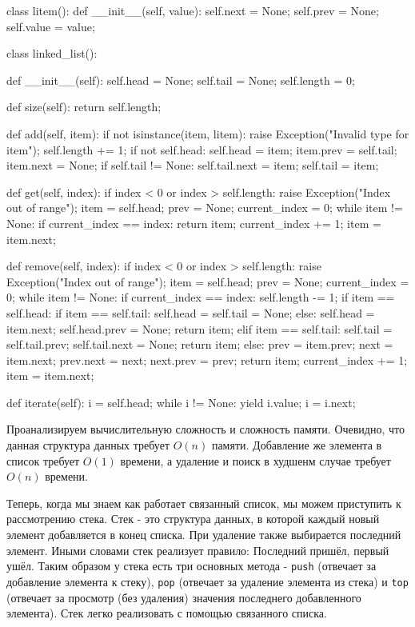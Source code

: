 \begin{python}
class litem():
	def __init__(self, value):
		self.next = None;
		self.prev = None;
		self.value = value;

class linked_list():

	def __init__(self):
		self.head = None;
		self.tail = None;
		self.length = 0;

	def size(self):
		return self.length;

	def add(self, item):
		if not isinstance(item, litem):
			raise Exception("Invalid type for item");
		self.length += 1;
		if not self.head:
			self.head = item;
		item.prev = self.tail;
		item.next = None;
		if self.tail != None:
			self.tail.next = item;
		self.tail = item;

	def get(self, index):
		if index < 0 or index > self.length:
			raise Exception("Index out of range");
		item = self.head;
		prev = None;
		current_index = 0;
		while item != None:
			if current_index == index:
				return item;
			current_index += 1;
			item = item.next;

	def remove(self, index):
		if index < 0 or index > self.length:
			raise Exception("Index out of range");
		item = self.head;
		prev = None;
		current_index = 0;
		while item != None:
			if current_index == index:
				self.length -= 1;
				if item == self.head:
					if item == self.tail:
						self.head = self.tail = None;
					else:
						self.head = item.next;
						self.head.prev = None;
					return item;
				elif item == self.tail:
					self.tail = self.tail.prev;
					self.tail.next = None;
					return item;
				else:
					prev = item.prev;
					next = item.next;
					prev.next = next;
					next.prev = prev;
					return item;
			current_index += 1;
			item = item.next;

	def iterate(self):
		i = self.head;
		while i != None:
			yield i.value;
			i = i.next;
\end{python}

Проанализируем вычислительную сложность и сложность памяти. Очевидно, что
данная структура данных требует $O(n)$ памяти. Добавление же элемента в
список требует $O(1)$ времени, а удаление и поиск в худшенм случае требует
$O(n)$ времени.

Теперь, когда мы знаем как работает связанный список, мы можем приступить 
к рассмотрению стека. Стек - это структура данных, в которой каждый 
новый элемент добавляется в конец списка. При удаление также выбирается
последний элемент. Иными словами стек реализует правило: Последний пришёл,
первый ушёл. Таким образом у стека есть три основных метода - \texttt{push} 
(отвечает за добавление элемента к стеку), \texttt{pop} (отвечает за удаление
элемента из стека) и \texttt{top} (отвечает за просмотр (без удаления) значения 
последнего добавленного элемента). Стек легко реализовать с помощью связанного 
списка.


